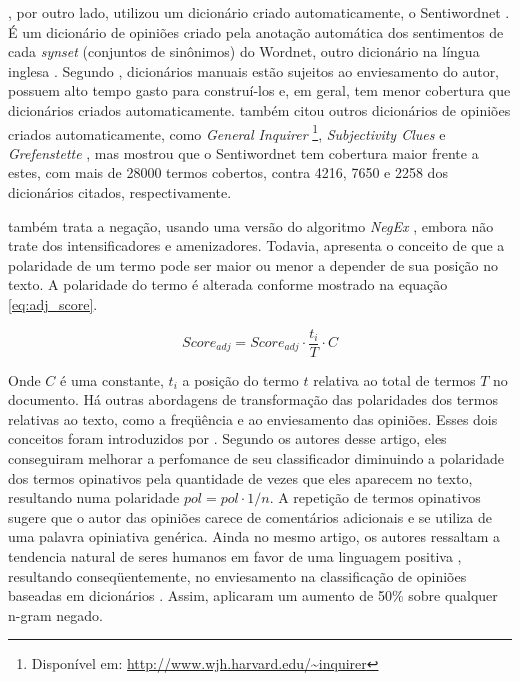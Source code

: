 \documentclass[template.tex]{subfiles}
\begin{document}
\cite{ohana2009sentiment}, por outro lado, utilizou um dicionário criado automaticamente, o Sentiwordnet \cite{esuli2006sentiwordnet}. É um dicionário de opiniões criado pela anotação automática dos sentimentos de cada \textit{synset} (conjuntos de sinônimos) do Wordnet, outro dicionário na língua inglesa \cite{fellbaum2005wordnet}. Segundo \cite{ohana2009sentiment}, dicionários manuais estão sujeitos ao enviesamento do autor, possuem alto tempo gasto para construí-los e, em geral, tem menor cobertura que dicionários criados automaticamente. \cite{ohana2009sentiment} também citou outros dicionários de opiniões criados automaticamente, como \textit{General Inquirer} \cite{stone1966general} \footnote{Disponível em: \url{http://www.wjh.harvard.edu/~inquirer}}, \textit{Subjectivity Clues} \cite{wilson2005recognizing} e \textit{Grefenstette} \cite{grefenstette2004coupling}, mas mostrou que o Sentiwordnet tem cobertura maior frente a estes, com mais de 28000 termos cobertos, contra 4216, 7650 e 2258 dos dicionários citados, respectivamente. 

\cite{ohana2009sentiment} também trata a negação, usando uma versão do algoritmo \textit{NegEx} \cite{chapman2001evaluation}, embora não trate dos intensificadores e amenizadores. Todavia, \cite{ohana2009sentiment} apresenta o conceito de que a polaridade de um termo pode ser maior ou menor a depender de sua posição no texto. A polaridade do termo é alterada conforme mostrado na equação \ref{eq:adj_score}.

\begin{equation}
Score_{adj} = Score_{adj} \cdot \frac{t_i}{T} \cdot C
\label{eq:adj_score}
\end{equation}

Onde $C$ é uma constante, $t_i$ a posição do termo $t$ relativa ao total de termos $T$ no documento.
Há outras abordagens de transformação das polaridades dos termos relativas ao texto, como a freqüência e ao enviesamento das opiniões. Esses dois conceitos foram introduzidos por \cite{taboada2011lexicon}. Segundo os autores desse artigo, eles conseguiram melhorar a perfomance de seu classificador diminuindo a polaridade dos termos opinativos pela quantidade de vezes que eles aparecem no texto, resultando numa polaridade $pol = pol \cdot 1/n$. A repetição de termos opinativos sugere que o autor das opiniões carece de comentários adicionais e se utiliza de uma palavra opiniativa genérica. Ainda no mesmo artigo, os autores ressaltam a tendencia natural de seres humanos em favor de uma linguagem positiva \cite{boucher1969pollyanna}, resultando conseqüentemente, no enviesamento na classificação de opiniões baseadas em dicionários \cite{kennedy2006sentiment}. Assim, \cite{taboada2011lexicon} aplicaram um aumento de 50\% sobre qualquer n-gram negado.
\end{document}
